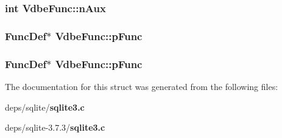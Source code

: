 \subsubsection{\setlength{\rightskip}{0pt plus 5cm}int \bf{Vdbe\-Func::n\-Aux}}\label{structVdbeFunc_4275233af945fce44b132712949e0892}


\subsubsection{\setlength{\rightskip}{0pt plus 5cm}\bf{Func\-Def}$\ast$ \bf{Vdbe\-Func::p\-Func}}\label{structVdbeFunc_ab221b0850c679bf0df57888afc5fd70}


\subsubsection{\setlength{\rightskip}{0pt plus 5cm}\bf{Func\-Def}$\ast$ \bf{Vdbe\-Func::p\-Func}}\label{structVdbeFunc_ab221b0850c679bf0df57888afc5fd70}




The documentation for this struct was generated from the following files:\begin{CompactItemize}
\item 
deps/sqlite/\bf{sqlite3.c}\item 
deps/sqlite-3.7.3/\bf{sqlite3.c}\end{CompactItemize}
